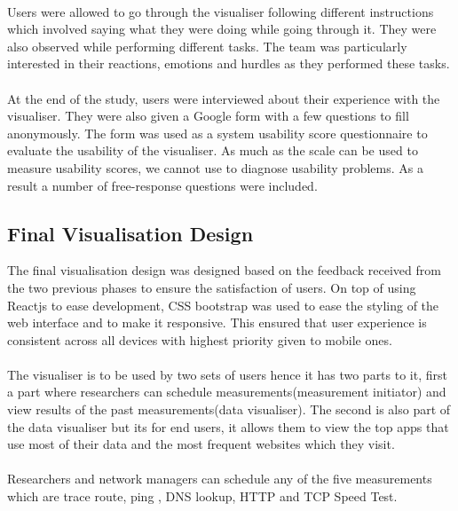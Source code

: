 \paragraph{}
Users were allowed to go through the visualiser following different instructions which involved saying what they were doing while going through it. They were also observed while performing different tasks. The team was particularly interested in their reactions, emotions and hurdles as they performed these tasks.
\paragraph{}
At the end of the study, users were interviewed about their experience with the visualiser. They were also given a Google form with a few questions to fill anonymously. The form was used as a system usability score questionnaire to evaluate the usability of the visualiser. As much as the scale can be used to measure usability scores, we cannot use to diagnose usability problems\cite{inproceedingsSauro}. As a result a number of free-response questions were included.
\subsection{Final Visualisation Design}
The final visualisation design was designed based on the feedback received from the two previous phases to ensure the satisfaction of users. On top of using Reactjs to ease development, CSS bootstrap was used to ease the styling of the web interface and to make it responsive. This ensured that user experience is consistent across all devices with highest priority given to mobile ones. 
\paragraph{}
The visualiser is to be used by two sets of users hence it has two parts to it, first a part where researchers can schedule measurements(measurement initiator) and view results of the past measurements(data visualiser). The second is also part of the data visualiser but its for end users, it allows them to view the top apps that use most of their data and the most frequent websites which they visit.
\paragraph{}
Researchers and network managers can schedule any of the five measurements which are trace route, ping , DNS lookup, HTTP and TCP  Speed Test. 
